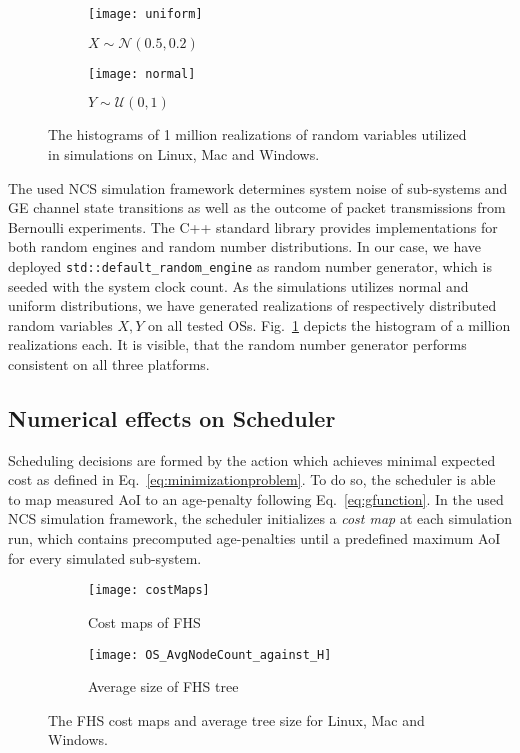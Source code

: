 \begin{figure}[htbp]
  \centering
  \begin{subfigure}[b]{0.49\textwidth}
      \centering
      \texttt{[image: uniform]}
      \caption{$X \sim \mathcal{N}(0.5, 0.2)$}
  \end{subfigure}
  \hfill
  \begin{subfigure}[b]{0.49\textwidth}
      \centering
      \texttt{[image: normal]}
      \caption{$Y \sim \mathcal{U}(0, 1)$}
  \end{subfigure}
    \caption{The histograms of 1 million realizations of random variables utilized in simulations on Linux, Mac and Windows.}
    \label{fig:randomCheck}
\end{figure}

The used NCS simulation framework determines system noise of sub-systems and GE
channel state transitions as well as the outcome of packet transmissions from
Bernoulli experiments. The C++ standard library provides implementations for
both random engines and random number distributions. In our case, we have
deployed \texttt{std::default\_random\_engine} as random number generator, which
is seeded with the system clock count. As the simulations utilizes normal and
uniform distributions, we have generated realizations of respectively
distributed random variables $X, Y$ on all tested OSs.
Fig.~\ref{fig:randomCheck} depicts the histogram of a million realizations each.
It is visible, that the random number generator performs consistent on all three
platforms.

\subsection{Numerical effects on Scheduler}

Scheduling decisions are formed by the action which achieves minimal expected
cost as defined in Eq.~\eqref{eq:minimizationproblem}. To do so, the scheduler
is able to map measured AoI to an age-penalty following
Eq.~\eqref{eq:gfunction}. In the used NCS simulation framework, the scheduler
initializes a \textit{cost map} at each simulation run, which contains
precomputed age-penalties until a predefined maximum AoI for every simulated
sub-system. 

\begin{figure}[htbp]
  \centering
  \begin{subfigure}[b]{0.49\textwidth}
      \centering
      \texttt{[image: costMaps]}
      \caption{Cost maps of FHS}
      \label{fig:costMaps}
  \end{subfigure}
  \hfill
  \begin{subfigure}[b]{0.49\textwidth}
      \centering
      \texttt{[image: OS\_AvgNodeCount\_against\_H]}
      \caption{Average size of FHS tree}
      \label{fig:treesize}
  \end{subfigure}
    \caption[Comparison of FHS cost maps and average tree size for different
    OS]{The FHS cost maps and average tree size for Linux, Mac and Windows.}
\end{figure}

